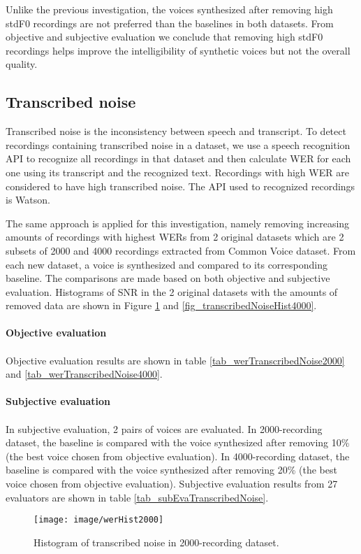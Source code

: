\documentclass[12pt]{article}
\begin{document}
Unlike the previous investigation, the voices synthesized after removing high stdF0 recordings are not preferred than the baselines in both datasets. From objective and subjective evaluation we conclude that removing high stdF0 recordings helps improve the intelligibility of synthetic voices but not the overall quality.

\subsection{Transcribed noise}
Transcribed noise is the inconsistency between speech and transcript. To detect recordings containing transcribed noise in a dataset, we use a speech recognition API to recognize all recordings in that dataset and then calculate WER for each one using its transcript and the recognized text. Recordings with high WER are considered to have high transcribed noise. The API used to recognized recordings is Watson.

The same approach is applied for this investigation, namely removing increasing amounts of recordings with highest WERs from 2 original datasets which are 2 subsets of 2000 and 4000 recordings extracted from Common Voice dataset. From each new dataset, a voice is synthesized and compared to its corresponding baseline. The comparisons are made based on both objective and subjective evaluation. Histograms of SNR in the 2 original datasets with the amounts of removed data are shown in Figure \ref{fig_transcribedNoiseHist2000} and \ref{fig_transcribedNoiseHist4000}.\\\\
\textbf{Objective evaluation}\\\\
Objective evaluation results are shown in table \ref{tab_werTranscribedNoise2000} and \ref{tab_werTranscribedNoise4000}.\\\\
\textbf{Subjective evaluation}\\\\
In subjective evaluation, 2 pairs of voices are evaluated. In 2000-recording dataset, the baseline is compared with the voice synthesized after removing 10\% (the best voice chosen from objective evaluation). In 4000-recording dataset, the baseline is compared with the voice synthesized after removing 20\% (the best voice chosen from objective evaluation). Subjective evaluation results from 27 evaluators are shown in table \ref{tab_subEvaTranscribedNoise}.

\begin{figure}[t]
\begin{center}
\texttt{[image: image/werHist2000]}
\end{center}
\vspace{-0.3cm}
\caption[transcribed noise Hist 2000.]{Histogram of transcribed noise in 2000-recording dataset.}
\label{fig_transcribedNoiseHist2000}
\end{figure}
\end{document}
